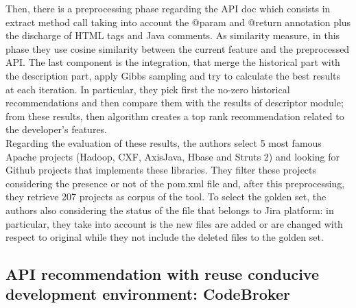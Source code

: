 Then, there is a preprocessing phase regarding the API doc which consists in extract method call taking into account the @param and @return annotation plus the discharge of HTML tags and Java comments. As similarity measure, in this phase they use cosine similarity between the current feature and the preprocessed API. The last component is the integration, that merge the historical part with the description part, apply Gibbs sampling and try to calculate the best results at each iteration. In particular, they pick first the no-zero historical recommendations and then compare them with the results of descriptor module; from these results, then algorithm creates a top rank recommendation related to the developer's features. \\
Regarding the evaluation of these results, the authors select 5 most famous Apache projects (Hadoop, CXF, AxisJava, Hbase and Struts 2) and looking for Github projects that implements these libraries. They filter these projects considering the presence or not of the pom.xml file and, after this preprocessing, they retrieve 207 projects as corpus of the tool. To select the golden set, the authors also considering the status of the file that belongs to Jira platform: in particular, they take into account is the new files are added or are changed with respect to original while they not include the deleted files to the golden set.


\subsection{API recommendation with reuse conducive development environment: CodeBroker}

